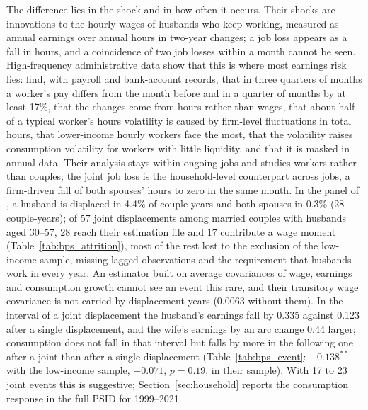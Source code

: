 The difference lies in the shock and in how often it occurs. Their shocks are innovations to the hourly wages of
husbands who keep working, measured as annual earnings over annual hours in two-year changes; a job loss appears as a
fall in hours, and a coincidence of two job losses within a month cannot be seen. High-frequency administrative data
show that this is where most earnings risk lies: \citet{ganong2026earnings} find, with payroll and bank-account records,
that in three quarters of months a worker's pay differs from the month before and in a quarter of months by at least
17\%, that the changes come from hours rather than wages, that about half of a typical worker's hours volatility is caused
by firm-level fluctuations in total hours, that lower-income hourly workers face the most, that the volatility raises
consumption volatility for workers with little liquidity, and that it is masked in annual data. Their analysis stays
within ongoing jobs and studies workers rather than couples; the joint job loss is the household-level counterpart across
jobs, a firm-driven fall of both spouses' hours to zero in the same month. In the panel of
\citet{blundell2016consumption}, a husband is displaced in 4.4\% of couple-years and both spouses in 0.3\% (28
couple-years); of 57 joint displacements among married couples with husbands aged 30--57, 28 reach their estimation file
and 17 contribute a wage moment (Table~\ref{tab:bps_attrition}), most of the rest lost to the exclusion of the
low-income sample, missing lagged observations and the requirement that husbands work in every year. An estimator built
on average covariances of wage, earnings and consumption growth cannot see an event this rare, and their transitory
wage covariance is not carried by displacement years (0.0063 without them). In the interval of a joint displacement the
husband's earnings fall by 0.335 against 0.123 after a single displacement, and the wife's earnings by an arc change
0.44 larger; consumption does not fall in that interval but falls by more in the following one after a joint than after
a single displacement (Table~\ref{tab:bps_event}: $-0.138^{**}$ with the low-income sample, $-0.071$, $p=0.19$, in their
sample). With 17 to 23 joint events this is suggestive; Section~\ref{sec:household} reports the consumption response in
the full PSID for 1999--2021.

